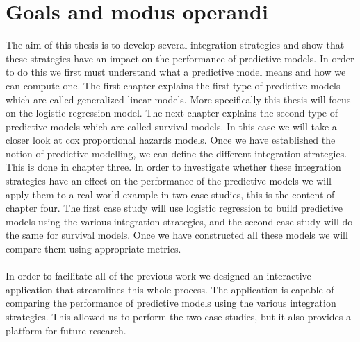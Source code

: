 \section{Goals and modus operandi}
The aim of this thesis is to develop several integration strategies and show that these strategies have an impact on the performance of predictive models. In order to do this we first must understand what a predictive model means and how we can compute one. The first chapter explains the first type of predictive models which are called generalized linear models. More specifically this thesis will focus on the logistic regression model. The next chapter explains the second type of predictive models which are called survival models. In this case we will take a closer look at cox proportional hazards models. Once we have established the notion of predictive modelling, we can define the different integration strategies. This is done in chapter three. In order to investigate whether these integration strategies have an effect on the performance of the predictive models we will apply them to a real world example in two case studies, this is the content of chapter four. The first case study will use logistic regression to build predictive models using the various integration strategies, and the second case study will do the same for survival models. Once we have constructed all these models we will compare them using appropriate metrics. \\ \\
In order to facilitate all of the previous work we designed an interactive application that streamlines this whole process. The application is capable of comparing the performance of predictive models using the various integration strategies. This allowed us to perform the two case studies, but it also provides a platform for future research. 
